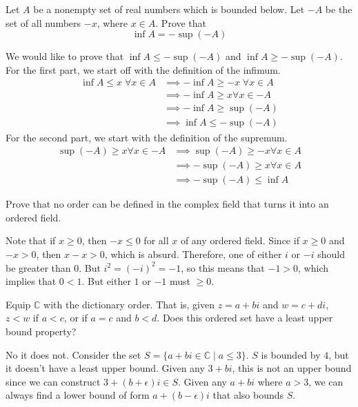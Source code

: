 \documentclass{article}
\begin{document}
    \begin{exercise}[Rudin 1.5]
    Let $A$ be a nonempty set of real numbers which is bounded below. Let $-A$ be the set of all numbers $-x$, where $x \in A$. Prove that 
    \[\inf A = -\sup(-A)\]
    \end{exercise}
    \begin{solution}
    We would like to prove that $\inf A \leq -\sup(-A)$ and $\inf A \geq -\sup(-A)$. For the first part, we start off with the definition of the infimum. 
    \begin{align*}
        \inf A \leq x \; \forall x \in A & \implies - \inf A \geq -x \; \forall x \in A \\
        & \implies - \inf A \geq x \forall x \in -A \\
        & \implies -\inf A \geq \sup(-A) \\
        & \implies \inf A \leq - \sup(-A)
    \end{align*}
    For the second part, we start with the definition of the supremum. 
    \begin{align*}
        \sup(-A) \geq x \forall x \in -A & \implies \sup(-A) \geq -x \forall x \in A \\
        & \implies -\sup(-A) \geq x \forall x \in A \\
        & \implies -\sup(-A) \leq \inf A
    \end{align*}
    \end{solution}

    \begin{exercise}[Rudin 1.8]
    Prove that no order can be defined in the complex field that turns it into an ordered field. 
    \end{exercise}
    \begin{solution}
    Note that if $x \geq 0$, then $-x \leq 0$ for all $x$ of any ordered field. Since if $x \geq 0$ and $-x > 0$, then $x -x > 0$, which is absurd. Therefore, one of either $i$ or $-i$ should be greater than $0$. But $i^2 = (-i)^2 = -1$, so this means that $-1 > 0$, which implies that $0 < 1$. But either $1$ or $-1$ must $\geq 0$. 
    \end{solution}

    \begin{exercise}[Rudin 1.9]
    Equip $\mathbb{C}$ with the dictionary order. That is, given $z = a + bi$ and $w = c + di$, $z < w$ if $a < c$, or if $a = c$ and $b < d$. Does this ordered set have a least upper bound property? 
    \end{exercise}
    \begin{solution}
    No it does not. Consider the set $S = \{ a + b i \in \mathbb{C} \mid a \leq 3\}$. $S$ is bounded by $4$, but it doesn't have a least upper bound. Given any $3 + bi$, this is not an upper bound since we can construct $3 + (b + \epsilon) i \in S$. Given any $a + bi$ where $a > 3$, we can always find a lower bound of form $a + (b - \epsilon) i$ that also bounds $S$. 
    \end{solution}
\end{document}
